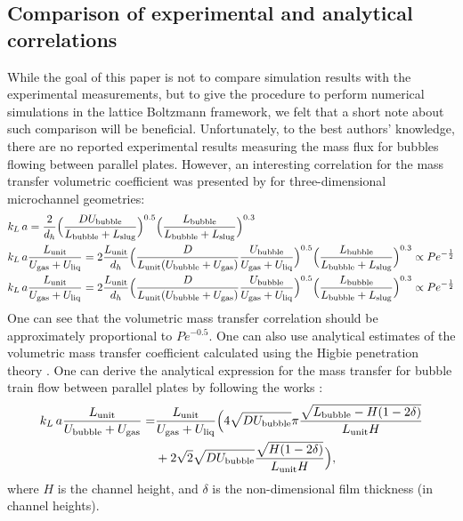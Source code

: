 \documentclass{article}
\newcommand{\beq}{\begin{equation}}
\newcommand{\feq}{\end{equation}}
\newcommand{\beqal}{\begin{equation}\begin{aligned}}
\newcommand{\feqal}{\end{aligned}\end{equation}}
\newcommand{\vol}{k_L\,a}
\newcommand{\lbubble}{L_{\mathrm{bubble}}}
\newcommand{\lunit}{L_{\mathrm{unit}}}
\newcommand{\lslug}{L_{\mathrm{slug}}}
\newcommand{\ububble}{U_{\mathrm{bubble}}}
\newcommand{\uliq}{U_{\mathrm{liq}}}
\newcommand{\ugas}{U_{\mathrm{gas}}}
\newcommand{\volnondim}{\vol \frac{\lunit}{\ububble+\ugas}}
\begin{document}
\subsection{Comparison of experimental and analytical correlations}
While the goal of this paper is not to compare simulation results with the experimental measurements, but to give the
procedure to perform numerical simulations  in the lattice Boltzmann framework, we felt that a
short note about such comparison will be beneficial.
Unfortunately, to the best authors' knowledge, there are no reported experimental results measuring the mass flux for
  bubbles flowing between parallel plates. However, an interesting
correlation for the mass transfer volumetric coefficient was presented by
\citet{yue-mass} for three-dimensional microchannel geometries:
\beqal
&\vol=\frac{2}{d_h}\Bigl(\frac{D \ububble}{\lbubble+\lslug}\Bigr)^{0.5}
\Bigl(\frac{\lbubble}{\lbubble+\lslug}\Bigr)^{0.3}\\
&\vol \frac{\lunit}{\ugas+\uliq}=2\frac{\lunit}{d_h} \Bigl(\frac{D 
}{\lunit (\ububble+\ugas)} \frac{\ububble}{\ugas+\uliq}\Bigr)^{0.5}
\Bigl(\frac{\lbubble}{\lbubble+\lslug}\Bigr)^{0.3} \propto Pe^{-\frac{1}{2}}\\
&\vol \frac{\lunit}{\ugas+\uliq}=2\frac{\lunit}{d_h} \Bigl(\frac{D 
}{\lunit (\ububble+\ugas)} \frac{\ububble}{\ugas+\uliq}\Bigr)^{0.5}
\Bigl(\frac{\lbubble}{\lbubble+\lslug}\Bigr)^{0.3} \propto Pe^{-\frac{1}{2}}
\feqal
One can see that  the volumetric mass transfer correlation should be approximately proportional to
$Pe^{-0.5}$.  One can also use analytical estimates of the volumetric mass transfer
coefficient calculated using the Higbie penetration theory \cite{higbie}. One can derive the analytical expression for the mass transfer for bubble train flow between parallel plates by following the works
\cite{irandoust,vanbaten-circular}:
\beq
\label{vanbaten:analytical:expresssion}
\begin{aligned}
\volnondim=&\frac{\lunit}{\ugas+\uliq}\Bigl(4 \sqrt{D \ububble}{\pi}
\frac{\sqrt{\lbubble-H (1-2\delta)}}{\lunit H}\\
&+2 \sqrt{2} \sqrt{D \ububble} \frac{\sqrt{H
(1-2\delta)}}{\lunit H}\Bigr),
\end{aligned}
\feq
where $H$ is the channel height, and $\delta$ is the non-dimensional film thickness (in channel heights).
\end{document}
